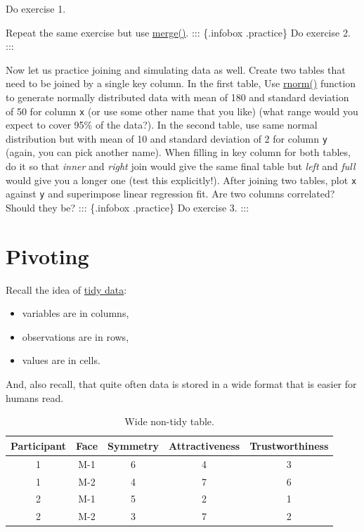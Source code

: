 \documentclass[
]{book}
\providecommand{\tightlist}{%
  \setlength{\itemsep}{0pt}\setlength{\parskip}{0pt}}
\begin{document}
Do exercise 1.

Repeat the same exercise but use \href{https://stat.ethz.ch/R-manual/R-devel/library/base/html/merge.html}{merge()}.
::: \{.infobox .practice\}
Do exercise 2.
:::

Now let us practice joining and simulating data as well. Create two tables that need to be joined by a single key column. In the first table, Use \href{https://stat.ethz.ch/R-manual/R-devel/library/stats/html/Normal.html}{rnorm()} function to generate normally distributed data with mean of 180 and standard deviation of 50 for column \texttt{x} (or use some other name that you like) (what range would you expect to cover 95\% of the data?). In the second table, use same normal distribution but with mean of 10 and standard deviation of 2 for column \texttt{y} (again, you can pick another name). When filling in key column for both tables, do it so that \emph{inner} and \emph{right} join would give the same final table but \emph{left} and \emph{full} would give you a longer one (test this explicitly!). After joining two tables, plot \texttt{x} against \texttt{y} and superimpose linear regression fit. Are two columns correlated? Should they be?
::: \{.infobox .practice\}
Do exercise 3.
:::

\hypertarget{pivoting}{%
\section{Pivoting}\label{pivoting}}

Recall the idea of \protect\hyperlink{tidydata}{tidy data}:

\begin{itemize}
\tightlist
\item
  variables are in columns,
\item
  observations are in rows,
\item
  values are in cells.
\end{itemize}

And, also recall, that quite often data is stored in a wide format that is easier for humans read.

\begin{table}

\caption{\label{tab:unnamed-chunk-198}Wide non-tidy table.}
\centering
\begin{tabular}[t]{c|c|c|c|c}
\hline
Participant & Face & Symmetry & Attractiveness & Trustworthiness\\
\hline
1 & M-1 & 6 & 4 & 3\\
\hline
1 & M-2 & 4 & 7 & 6\\
\hline
2 & M-1 & 5 & 2 & 1\\
\hline
2 & M-2 & 3 & 7 & 2\\
\hline
\end{tabular}
\end{table}
\end{document}
